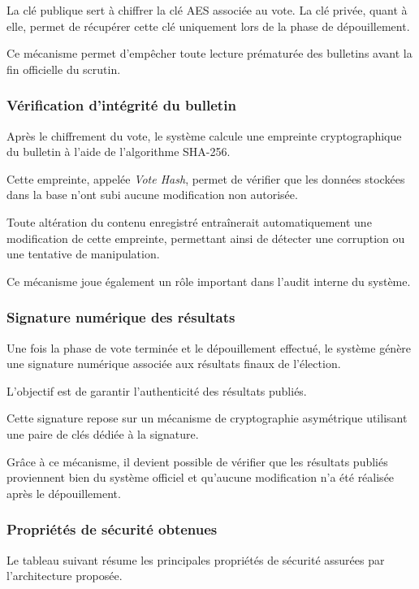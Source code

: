 ﻿\documentclass[12pt,a4paper]{report}
\begin{document}
La clé publique sert à chiffrer la clé AES associée au vote. La clé privée,
quant à elle, permet de récupérer cette clé uniquement lors de la phase de
dépouillement.

Ce mécanisme permet d’empêcher toute lecture prématurée des bulletins avant la
fin officielle du scrutin.

\subsubsection{Vérification d’intégrité du bulletin}

Après le chiffrement du vote, le système calcule une empreinte cryptographique
du bulletin à l’aide de l’algorithme SHA-256.

Cette empreinte, appelée \textit{Vote Hash}, permet de vérifier que les données
stockées dans la base n’ont subi aucune modification non autorisée.

Toute altération du contenu enregistré entraînerait automatiquement une
modification de cette empreinte, permettant ainsi de détecter une corruption ou
une tentative de manipulation.

Ce mécanisme joue également un rôle important dans l’audit interne du système.

\subsubsection{Signature numérique des résultats}

Une fois la phase de vote terminée et le dépouillement effectué, le système
génère une signature numérique associée aux résultats finaux de l’élection.

L’objectif est de garantir l’authenticité des résultats publiés.

Cette signature repose sur un mécanisme de cryptographie asymétrique utilisant
une paire de clés dédiée à la signature.

Grâce à ce mécanisme, il devient possible de vérifier que les résultats publiés
proviennent bien du système officiel et qu’aucune modification n’a été réalisée
après le dépouillement.


\subsubsection{Propriétés de sécurité obtenues}

Le tableau suivant résume les principales propriétés de sécurité assurées par
l’architecture proposée.
\end{document}
